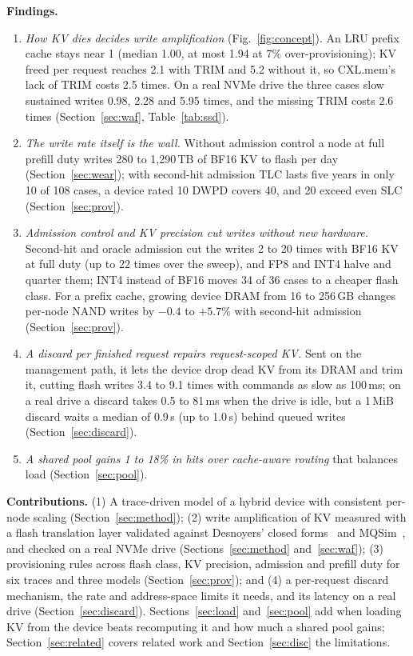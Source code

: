 \documentclass[acmsmall,screen,review]{acmart}
\begin{document}
\textbf{Findings.}
\begin{enumerate}
\item \emph{How KV dies decides write amplification} (Fig.~\ref{fig:concept}). An LRU prefix cache
stays near 1 (median 1.00, at most 1.94 at 7\% over-provisioning); KV freed per request reaches 2.1
with TRIM and 5.2 without it, so CXL.mem's lack of TRIM costs 2.5 times. On a real NVMe drive the
three cases slow sustained writes 0.98, 2.28 and 5.95 times, and the missing TRIM costs 2.6 times
(Section~\ref{sec:waf}, Table~\ref{tab:ssd}).
\item \emph{The write rate itself is the wall.} Without admission control a node at full prefill
duty writes 280 to 1,290\,TB of BF16 KV to flash per day (Section~\ref{sec:wear}); with second-hit
admission TLC lasts five years in only 10 of 108 cases, a device rated 10 DWPD covers 40, and 20
exceed even SLC (Section~\ref{sec:prov}).
\item \emph{Admission control and KV precision cut writes without new hardware.} Second-hit and oracle admission
cut the writes 2 to 20 times with BF16 KV at full duty (up to 22 times over the sweep), and FP8 and
INT4 halve and quarter them; INT4 instead of BF16 moves 34
of 36 cases to a cheaper flash class. For a prefix cache, growing device DRAM from 16 to 256\,GB
changes per-node NAND writes by $-0.4$ to $+5.7\%$ with second-hit admission (Section~\ref{sec:prov}).
\item \emph{A discard per finished request repairs request-scoped KV.} Sent on the management path,
it lets the device drop dead KV from its DRAM and trim it, cutting flash writes 3.4 to 9.1 times
with commands as slow as 100\,ms; on a real drive a discard takes 0.5 to 81\,ms when the drive is
idle, but a 1\,MiB discard waits a median of 0.9\,s (up to 1.0\,s) behind queued writes
(Section~\ref{sec:discard}).
\item \emph{A shared pool gains 1 to 18\% in hits over cache-aware routing} that balances load (Section~\ref{sec:pool}).
\end{enumerate}

\textbf{Contributions.} (1) A trace-driven model of a hybrid device with consistent per-node scaling
(Section~\ref{sec:method}); (2) write amplification of KV measured with a flash translation layer
validated against Desnoyers' closed forms~\cite{desnoyers} and MQSim~\cite{mqsim}, and checked on a
real NVMe drive (Sections~\ref{sec:method} and~\ref{sec:waf}); (3) provisioning rules across flash
class, KV precision, admission and prefill duty for six traces and three models
(Section~\ref{sec:prov}); and (4) a per-request discard mechanism, the rate and address-space limits
it needs, and its latency on a real drive (Section~\ref{sec:discard}). Sections~\ref{sec:load} and~\ref{sec:pool} add when loading KV from the
device beats recomputing it and how much a shared pool gains; Section~\ref{sec:related} covers
related work and Section~\ref{sec:disc} the limitations.
\end{document}
